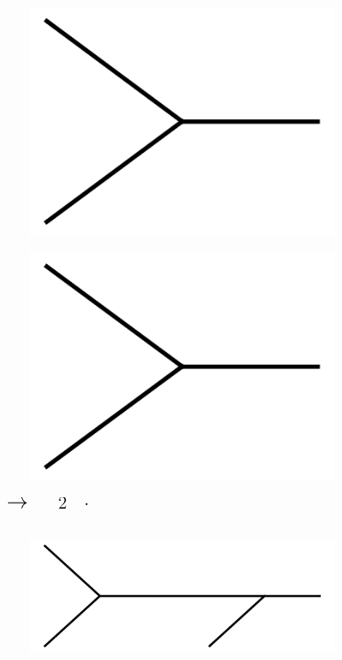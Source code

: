 \documentclass[11pt,a4paper,twoside,pdf]{article}
\numberwithin{equation}{section}
\begin{document}
\begin{figure}[h!]
  \centering
    \begin{subfigure}[t]{.1\textwidth}
    \includegraphics[width=\textwidth]{plots/1to2.png}
    \end{subfigure}%
    \begin{subfigure}[t]{.1\textwidth}
    \includegraphics[width=\textwidth]{plots/1to2.png}
    \end{subfigure}%
    $\displaystyle \quad %
    \raisebox{1.8\height}{\LARGE $\to$}\quad $
    $\displaystyle \quad %
    \raisebox{1.2\height}{\Large $2\quad\cdot$} $
    \begin{subfigure}[t]{.2\textwidth}
    \includegraphics[width=\textwidth]{plots/1to3.png}
    \end{subfigure}%
\end{figure}
\end{document}
